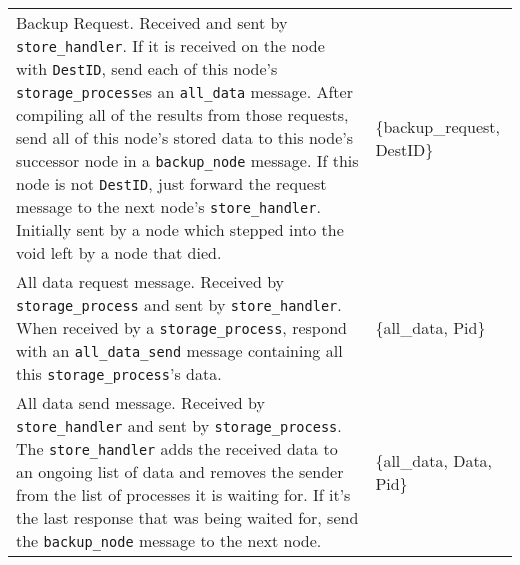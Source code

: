 \documentclass[12pt,letterpaper]{article}
\renewcommand{\tt}[1]{\texttt{#1}}
\newcommand{\sh}{\tt{store\_handler}}
\renewcommand{\sp}{\tt{storage\_process}}
\begin{document}
\begin{longtable}{p{4.5in}T}
Backup Request.  Received and sent by \sh.  If it is received on the node with \tt{DestID}, send each of this node's \sp es an \tt{all\_data} message.  After compiling all of the results from those requests, send all of this node's stored data to this node's successor node in a \tt{backup\_node} message.  If this node is not \tt{DestID}, just forward the request message to the next node's \sh. Initially sent by a node which stepped into the void left by a node that died.  & 
\{backup\_request, DestID\} \\

All data request message.  Received by \sp{} and sent by \sh.  When received by a \sp, respond with an \tt{all\_data\_send} message containing all this \sp's data.  & 
\{all\_data, Pid\} \\

All data send message.  Received by \sh{} and sent by \sp.  The \sh{} adds the received data to an ongoing list of data and removes the sender from the list of processes it is waiting for. If it's the last response that was being waited for, send the \tt{backup\_node} message to the next node. & 
\{all\_data, Data, Pid\}

\end{longtable}

\clearpage
\onehalfspacing
\end{document}
